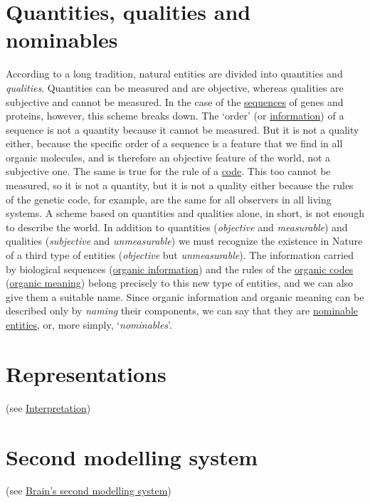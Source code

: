 \documentclass[12pt]{article}
\begin{document}
\section{Quantities, qualities and nominables}
According to a long tradition, natural entities are divided into \hypertarget{physical_quantities}{quantities} and \textit{qualities}. Quantities can be measured and are objective, whereas qualities are subjective and cannot be measured. In the case of the \hyperlink{sequences}{sequences} of genes and proteins, however, this scheme breaks down. The `order' (or \hyperlink{organic_information}{information}) of a sequence is not a quantity because it cannot be measured. But it is not a quality either, because the specific order of a sequence is a feature that we find in all organic molecules, and is therefore an objective feature of the world, not a subjective one. The same is true for the rule of a \hyperlink{code}{code}. This too cannot be measured, so it is not a quantity, but it is not a quality either because the rules of the genetic code, for example, are the same for all observers in all living systems. A scheme based on quantities and qualities alone, in short, is not enough to describe the world. In addition to quantities (\textit{objective} and \textit{measurable}) and qualities (\textit{subjective} and \textit{unmeasurable}) we must recognize the existence in Nature of a third type of entities (\textit{objective} but \textit{unmeasurable}). The information carried by biological sequences (\hyperlink{organic_information}{organic information}) and the rules of the \hyperlink{organic_codes}{organic codes} (\hyperlink{organic_meaning}{organic meaning}) belong precisely to this new type of entities, and we can also give them a suitable name. Since organic information and organic meaning can be described only by \textit{naming} their components, we can say that they are \hyperlink{nominable_entities}{nominable entities}, or, more simply, `\textit{nominables}'.


\hypertarget{representations}{}
\section{Representations} (see \hyperlink{interpretation}{Interpretation})


\hypertarget{second_modelling_system}{}
\section{Second modelling system} (see \hyperlink{brains_second_modelling_system}{Brain's second modelling system})
\end{document}
